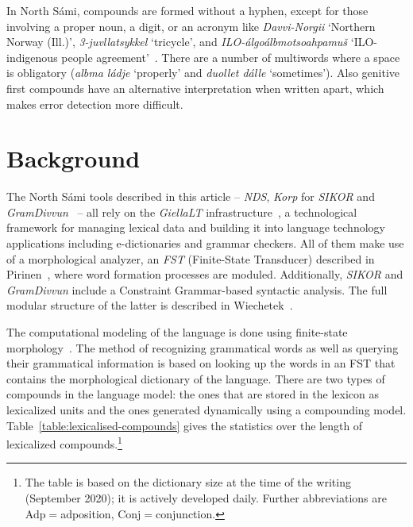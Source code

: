 \documentclass[free]{flammie}
\begin{document}
In North Sámi, compounds are formed without a hyphen, except for those involving a proper noun, a digit, or an acronym like \textit{Davvi-Norgii} `Northern Norway (Ill.)',
\textit{3-juvllatsykkel} `tricycle',
and \textit{ILO-álgoálbmotsoahpamuš} `ILO-indigenous people agreement'~\cite[p.46]{callinravagirji2015}. %
There are a number of multiwords where a space is obligatory (\textit{albma ládje} `properly' and \textit{duollet dálle} `sometimes'). Also %
genitive first compounds have an alternative interpretation when
written apart, %
which makes error detection more difficult.


\section{Background}

The North Sámi tools described in this article -- \textit{NDS}, \textit{Korp} for \textit{SIKOR} and
\textit{GramDivvun}~\cite{Wiechetek2012} -- all rely on the \textit{GiellaLT}
infrastructure~\cite{Moshagen2013BuildingAO}, a technological framework
for managing lexical data and building it into language technology applications
including e-dictionaries and grammar checkers.  All of them make use of a
morphological analyzer, an \textit{FST} (Finite-State Transducer) described in
Pirinen~\cite{Pirinen2014}, where word formation processes are moduled.
Additionally, \textit{SIKOR} and \textit{GramDivvun} include a Constraint
Grammar-based syntactic analysis. The full modular structure of the latter is
described in Wiechetek~\cite{Wiechetek2019}.


The computational modeling of the language is done using finite-state
morphology~\cite{Beesley2003}. The method of recognizing grammatical
words as well as querying their grammatical information is based on
looking up the words in an FST that contains the morphological
dictionary of the language.  There are two types of compounds in the
language model: the ones that are stored in the lexicon as lexicalized
units and the ones generated dynamically using a compounding model.
Table~\ref{table:lexicalised-compounds} gives the statistics over the length of lexicalized compounds.\footnote{The table is based on the dictionary size at the time of the writing (September 2020); it is actively  developed daily. Further abbreviations are Adp$=$adposition, Conj$=$conjunction.}
\end{document}
